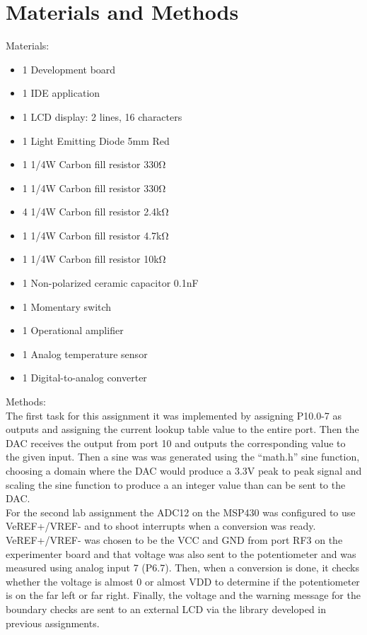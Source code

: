 \documentclass[journal]{IEEEtran}
\begin{document}
\section{Materials and Methods}
Materials:
\begin{itemize}
  \item 1 Development board
  \item 1 IDE application
  \item 1 LCD display: 2 lines, 16 characters
  \item 1 Light Emitting Diode 5\si{\milli\meter} Red
  \item 1 1/4W Carbon fill resistor 330\si{\ohm}
  \item 1 1/4W Carbon fill resistor 330\si{\ohm}
  \item 4 1/4W Carbon fill resistor 2.4\si{\kilo\ohm}
  \item 1 1/4W Carbon fill resistor 4.7\si{\kilo\ohm}
  \item 1 1/4W Carbon fill resistor 10\si{\kilo\ohm}
  \item 1 Non-polarized ceramic capacitor 0.1\si{\nano\farad}
  \item 1 Momentary switch
  \item 1 Operational amplifier
  \item 1 Analog temperature sensor
  \item 1 Digital-to-analog converter
\end{itemize}
Methods:\\
The first task for this assignment it was implemented by assigning P10.0-7 as outputs and assigning the current lookup table value to the entire port. Then the DAC receives the output from port 10 and outputs the corresponding value to the given input. Then a sine was was generated using the ``math.h'' sine function, choosing a domain where the DAC would produce a 3.3\si{\V} peak to peak signal and scaling the sine function to produce a an integer value than can be sent to the DAC.\\
For the second lab assignment the ADC12 on the MSP430 was configured to use VeREF+/VREF- and to shoot interrupts when a conversion was ready. VeREF+/VREF- was chosen to be the VCC and GND from port RF3 on the experimenter board and that voltage was also sent to the potentiometer and was measured using analog input 7 (P6.7). Then, when a conversion is done, it checks whether the voltage is almost 0 or almost VDD to determine if the potentiometer is on the far left or far right. Finally, the voltage and the warning message for the boundary checks are sent to an external LCD via the library developed in previous assignments.\\
\end{document}
